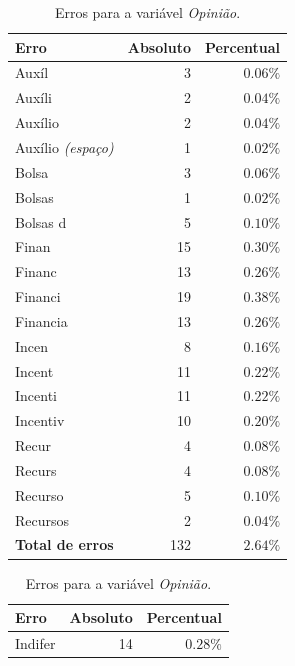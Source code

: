 \documentclass[10pt,a4paper,oneside]{article}
\begin{document}
\begin{table}[!h]
\small
\centering
\begin{minipage}[t]{0.49\textwidth}
\caption{Erros para a variável \textit{Pagamento}.}
\vspace{0.5em}
\label{table: erros-pagamento}
\begin{tabular}{l r r}
	\toprule
	\textbf{Erro} & \textbf{Absoluto}  & \textbf{Percentual} \\
	\midrule
	Auxíl     		& 3   & $0.06\%$ \\
	Auxíli 	  		& 2   & $0.04\%$ \\
	Auxílio    	 	& 2   & $0.04\%$ \\
	Auxílio \textit{(espaço)}   	& 1   & $0.02\%$ \\
	Bolsa      	 	& 3   & $0.06\%$ \\
	Bolsas     	 	& 1   & $0.02\%$ \\
	Bolsas d   	 	& 5   & $0.10\%$ \\
	Finan      	 	& 15  & $0.30\%$ \\
	Financ     	 	& 13  & $0.26\%$ \\
	Financi    	 	& 19  & $0.38\%$ \\
	Financia   	 	& 13  & $0.26\%$ \\
	Incen      	 	& 8   & $0.16\%$ \\
	Incent     	 	& 11  & $0.22\%$ \\
	Incenti    	 	& 11  & $0.22\%$ \\
	Incentiv   	 	& 10  & $0.20\%$ \\
	Recur      	 	& 4   & $0.08\%$ \\
	Recurs     	 	& 4   & $0.08\%$ \\
	Recurso    	 	& 5   & $0.10\%$ \\
	Recursos   	 	& 2   & $0.04\%$ \\	
	\midrule
	\textbf{Total de erros}  & 132  & $2.64\%$ \\	
	\bottomrule
\end{tabular}
\end{minipage}
%
\begin{minipage}[t]{0.49\textwidth}
\small
\caption{Erros para a variável \textit{Opinião}.}
\vspace{0.5em}
\label{table: erros-opiniao}
\begin{tabular}{l r r}
	\toprule
	\textbf{Erro} & \textbf{Absoluto}  & \textbf{Percentual} \\
	\midrule
	Indifer    & 14  & $0.28\%$ \\

\end{tabular}
\end{minipage}
\end{table}
\end{document}
